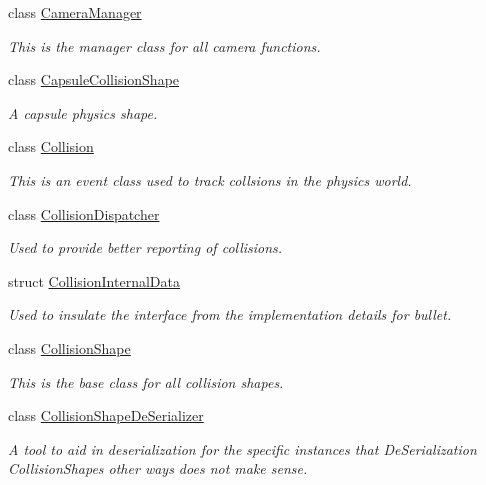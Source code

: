 \begin{DoxyCompactItemize}
class \hyperlink{classMezzanine_1_1CameraManager}{CameraManager}
\begin{DoxyCompactList}\small\item\em This is the manager class for all camera functions. \item\end{DoxyCompactList}\item 
class \hyperlink{classMezzanine_1_1CapsuleCollisionShape}{CapsuleCollisionShape}
\begin{DoxyCompactList}\small\item\em A capsule physics shape. \item\end{DoxyCompactList}\item 
class \hyperlink{classMezzanine_1_1Collision}{Collision}
\begin{DoxyCompactList}\small\item\em This is an event class used to track collsions in the physics world. \item\end{DoxyCompactList}\item 
class \hyperlink{classMezzanine_1_1CollisionDispatcher}{CollisionDispatcher}
\begin{DoxyCompactList}\small\item\em Used to provide better reporting of collisions. \item\end{DoxyCompactList}\item 
struct \hyperlink{structMezzanine_1_1CollisionInternalData}{CollisionInternalData}
\begin{DoxyCompactList}\small\item\em Used to insulate the interface from the implementation details for bullet. \item\end{DoxyCompactList}\item 
class \hyperlink{classMezzanine_1_1CollisionShape}{CollisionShape}
\begin{DoxyCompactList}\small\item\em This is the base class for all collision shapes. \item\end{DoxyCompactList}\item 
class \hyperlink{classMezzanine_1_1CollisionShapeDeSerializer}{CollisionShapeDeSerializer}
\begin{DoxyCompactList}\small\item\em A tool to aid in deserialization for the specific instances that DeSerialization CollisionShapes other ways does not make sense. \item\end{DoxyCompactList}\item 

\end{DoxyCompactItemize}
